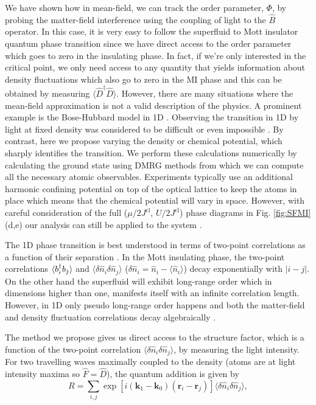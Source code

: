 We have shown how in mean-field, we can track the order parameter,
$\Phi$, by probing the matter-field interference using the coupling of
light to the $\hat{B}$ operator. In this case, it is very easy to
follow the superfluid to Mott insulator quantum phase transition since
we have direct access to the order parameter which goes to zero in the
insulating phase. In fact, if we're only interested in the critical
point, we only need access to any quantity that yields information
about density fluctuations which also go to zero in the MI phase and
this can be obtained by measuring
$\langle \hat{D}^\dagger \hat{D} \rangle$. However, there are many
situations where the mean-field approximation is not a valid
description of the physics. A prominent example is the Bose-Hubbard
model in 1D \cite{cazalilla2011, ejima2011, kuhner2000, pino2012,
  pino2013}. Observing the transition in 1D by light at fixed density
was considered to be difficult \cite{rogers2014} or even impossible
\cite{roth2003}. By contrast, here we propose varying the density or
chemical potential, which sharply identifies the transition. We
perform these calculations numerically by calculating the ground state
using DMRG methods \cite{tnt} from which we can compute all the
necessary atomic observables. Experiments typically use an additional
harmonic confining potential on top of the optical lattice to keep the
atoms in place which means that the chemical potential will vary in
space. However, with careful consideration of the full
($\mu/2J^\text{cl}$, $U/2J^\text{cl}$) phase diagrams in
Fig. \ref{fig:SFMI}(d,e) our analysis can still be applied to the
system \cite{batrouni2002}.

The 1D phase transition is best understood in terms of two-point
correlations as a function of their separation \cite{giamarchi}. In
the Mott insulating phase, the two-point correlations
$\langle b^\dagger_i b_j \rangle$ and
$\langle \delta \hat{n}_i \delta \hat{n}_j \rangle$
($\delta \hat{n}_i =\hat{n}_i-\langle \hat{n}_i\rangle$) decay
exponentially with $|i-j|$. On the other hand the superfluid will
exhibit long-range order which in dimensions higher than one,
manifests itself with an infinite correlation length. However, in 1D
only pseudo long-range order happens and both the matter-field and
density fluctuation correlations decay algebraically \cite{giamarchi}.

The method we propose gives us direct access to the structure factor,
which is a function of the two-point correlation $\langle \delta
\hat{n}_i \delta \hat{n}_j \rangle$, by measuring the light
intensity. For two travelling waves maximally coupled to the density
(atoms are at light intensity maxima so $\hat{F} = \hat{D}$), the
quantum addition is given by
\begin{equation} 
  R =\sum_{i, j} \exp[i (\mathbf{k}_1 - \mathbf{k}_0)
  (\mathbf{r}_i - \mathbf{r}_j)] \langle \delta \hat{n}_i \delta
  \hat{n}_j \rangle,
\end{equation}

